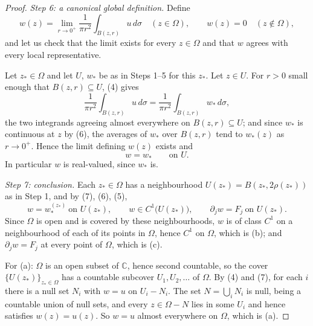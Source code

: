 \begin{proof}
\emph{Step 6: a canonical global definition.}  Define
\[
  w(z)=\lim_{r\to0^{+}}\frac{1}{\pi r^{2}}\int_{B(z,r)}u\,d\sigma
  \quad(z\in\Omega),\qquad w(z)=0\quad(z\notin\Omega),
\]
and let us check that the limit exists for every $z\in\Omega$ and that $w$
agrees with every local representative.

Let $z_*\in\Omega$ and let $U$, $w_*$ be as in Steps 1--5 for this $z_*$.  Let
$z\in U$.  For $r>0$ small enough that $B(z,r)\subseteq U$, (4) gives
\[
  \frac{1}{\pi r^{2}}\int_{B(z,r)}u\,d\sigma
  =\frac{1}{\pi r^{2}}\int_{B(z,r)}w_*\,d\sigma ,
\]
the two integrands agreeing almost everywhere on $B(z,r)\subseteq U$; and since
$w_*$ is continuous at $z$ by (6), the averages of $w_*$ over $B(z,r)$ tend to
$w_*(z)$ as $r\to0^{+}$.  Hence the limit defining $w(z)$ exists and
\begin{equation}\tag{7}
  w=w_*\qquad\text{on }U .
\end{equation}
In particular $w$ is real-valued, since $w_*$ is.

\emph{Step 7: conclusion.}  Each $z_*\in\Omega$ has a neighbourhood
$U(z_*)=B(z_*,2\rho(z_*))$ as in Step 1, and by (7), (6), (5),
\[
  w=w_*^{(z_*)}\ \text{on }U(z_*),\qquad
  w\in C^1\bigl(U(z_*)\bigr),\qquad \partial_jw=F_j\ \text{on }U(z_*).
\]
Since $\Omega$ is open and is covered by these neighbourhoods, $w$ is of class
$C^1$ on a neighbourhood of each of its points in $\Omega$, hence $C^1$ on
$\Omega$, which is (b); and $\partial_jw=F_j$ at every point of $\Omega$, which
is (c).

For (a): $\Omega$ is an open subset of $\mathbb{C}$, hence second countable, so
the cover $\{U(z_*)\}_{z_*\in\Omega}$ has a countable subcover
$U_1,U_2,\dots$ of $\Omega$.  By (4) and (7), for each $i$ there is a null set
$N_i$ with $w=u$ on $U_i-N_i$.  The set $N=\bigcup_iN_i$ is null, being a
countable union of null sets, and every $z\in\Omega-N$ lies in some $U_i$ and
hence satisfies $w(z)=u(z)$.  So $w=u$ almost everywhere on $\Omega$, which is
(a).
\end{proof}
